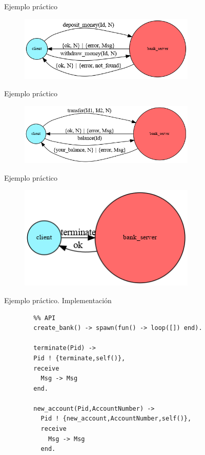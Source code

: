\documentclass{beamer}
\begin{document}
    \begin{frame}{Ejemplo práctico}
      \begin{figure}
        \includegraphics[width=0.75\textwidth]{deposit-withdraw_money.dot.png}
      \end{figure}
    \end{frame}

    \begin{frame}{Ejemplo práctico}
      \begin{figure}
        \includegraphics[width=0.75\textwidth]{transfer-balance.dot.png}
      \end{figure}
    \end{frame}

    \begin{frame}{Ejemplo práctico}
      \begin{figure}
        \includegraphics[width=0.75\textwidth]{terminate.dot.png}
      \end{figure}
    \end{frame}

    \begin{frame}[fragile]{Ejemplo práctico. Implementación}
      \begin{verbatim}
        %% API
        create_bank() -> spawn(fun() -> loop([]) end).

        terminate(Pid) ->
        Pid ! {terminate,self()},
        receive
          Msg -> Msg
        end.

        new_account(Pid,AccountNumber) ->
          Pid ! {new_account,AccountNumber,self()},
          receive
            Msg -> Msg
          end.
      \end{verbatim}
    \end{frame}
\end{document}
